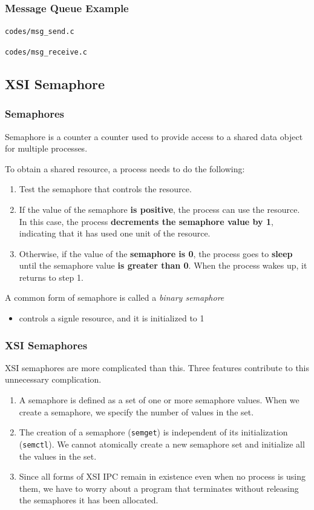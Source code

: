 \documentclass[newPxFont,sthlmFooter,nooffset]{beamer}
\begin{document}
\begin{frame}
  \frametitle{Message Queue Example}
\bigskip
\texttt{codes/msg\_send.c}
  

\newpage
\bigskip
\texttt{codes/msg\_receive.c}
  
\end{frame}

\subsection{XSI Semaphore}

\begin{frame}[t]
  \frametitle{Semaphores}
Semaphore is a counter a counter used to provide access to a shared data object for multiple processes.

To obtain a shared resource, a process needs to do the following:
\begin{enumerate}
\item Test the semaphore that controls the resource.
\item If the value of the semaphore \textbf{is positive}, the process can use the resource. In this case, the process \textbf{decrements the semaphore value by 1}, indicating that it has used one unit of the resource.
\item Otherwise, if the value of the \textbf{semaphore is 0}, the process goes to \textbf{sleep} until the semaphore value \textbf{is greater than 0}. When the process wakes up, it returns to step 1.
\end{enumerate}
A common form of semaphore is called a \textit{binary semaphore}
\begin{itemize}
\item controls a signle resource, and it is initialized to 1
\end{itemize}

\end{frame}



\begin{frame}[t]
  \frametitle{XSI Semaphores}
XSI semaphores are more complicated than this. Three features contribute to this unnecessary complication.
\begin{enumerate}
\item A semaphore is defined as a set of one or more semaphore values. When we create a semaphore, we specify the number of values in the set.
\item The creation of a semaphore (\texttt{semget}) is independent of its initialization (\texttt{semctl}).  We cannot atomically create a new semaphore set and initialize all the values in the set.
\item Since all forms of XSI IPC remain in existence even when no process is using them, we have to worry about a program that terminates without releasing the semaphores it has been allocated. 
\end{enumerate}
\end{frame}
\end{document}
